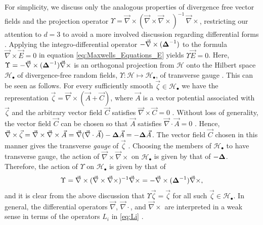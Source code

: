 \documentclass{cmslatex}
\newcommand\bDelta{\mbox{\boldmath${\Delta}$}}
\begin{document}
For simplicity, we discuss only the analogous properties of divergence
free vector fields and the projection operator
$\Upsilon=\vec{\nabla}\times(\vec{\nabla}\times\vec{\nabla}\times)^{-1}\,\vec{\nabla}\times$, restricting our
attention to $d=3$ to avoid a more involved discussion regarding
differential forms \cite{Darling:Differential_Forms:1994}.
Applying the integro-differential
operator $-\vec{\nabla}\times(\bDelta^{-1})$ to the formula
$\vec{\nabla}\times\vec{E}=0$ in equation \eqref{eq:Maxwells_Equations_E} yields  
$\Upsilon\vec{E}=0$. Here, $\Upsilon=-\vec{\nabla}\times(\bDelta^{-1})\vec{\nabla}\times$ is an
orthogonal projection from $\mathscr{H}$ onto the Hilbert space 
$\mathscr{H}_{\bullet}$ of divergence-free random fields,
$\Upsilon:\mathscr{H}\mapsto\mathscr{H}_\bullet$, of transverse gauge
\cite{Murphy:JMP:063506}. This can be seen as follows. For every
sufficiently smooth $\vec{\zeta}\in\mathscr{H}_\bullet$ we have the representation
$\vec{\zeta}=\vec{\nabla}\times(\vec{A}+\vec{C})$, where $\vec{A}$ is a vector
potential associated with $\vec{\zeta}$ and the arbitrary vector field
$\vec{C}$ satisfies $\vec{\nabla}\times\vec{C}=0$ \cite{Jackson-1999}. Without
loss of generality, the vector field $\vec{C}$ can be chosen so that
$\vec{A}$ satisfies $\vec{\nabla}\cdot\vec{A}=0$ \cite{Jackson-1999}. Hence,
$\vec{\nabla}\times\vec{\zeta}=\vec{\nabla}\times\vec{\nabla}\times\vec{A}
=\vec{\nabla}(\vec{\nabla}\cdot\vec{A})-\bDelta\vec{A}=-\bDelta\vec{A}$. The vector field
$\vec{C}$ chosen in this manner gives the transverse \emph{gauge} of
$\vec{\zeta}$ \cite{Jackson-1999}. Choosing the members of 
$\mathscr{H}_\bullet$ to have transverse gauge, the action of
$\vec{\nabla}\times\vec{\nabla}\times$ on $\mathscr{H}_\bullet$ is given by that of
$-\bDelta$. Therefore, the action of $\Upsilon$ on $\mathscr{H}_\bullet$ is given
by that of 
%
\begin{align}\label{eq:GammaCurl}
  \Upsilon=\vec{\nabla}\times(\vec{\nabla}\times\vec{\nabla}\times)^{-1}\vec{\nabla}\times
  =-\vec{\nabla}\times(\bDelta^{-1})\vec{\nabla}\times, 
\end{align}
%
and it is clear from the above discussion that $\Upsilon\vec{\zeta}=\vec{\zeta}$ for
all such $\vec{\zeta}\in\mathscr{H}_\bullet$. In general, the differential
operators $\vec{\nabla}$, $\vec{\nabla}\cdot$, and $\vec{\nabla}\times$ are interpreted
in a weak sense in terms of the operators $L_i$ in \eqref{eq:Li}
\cite{Golden:CMP-473}. 
\end{document}
